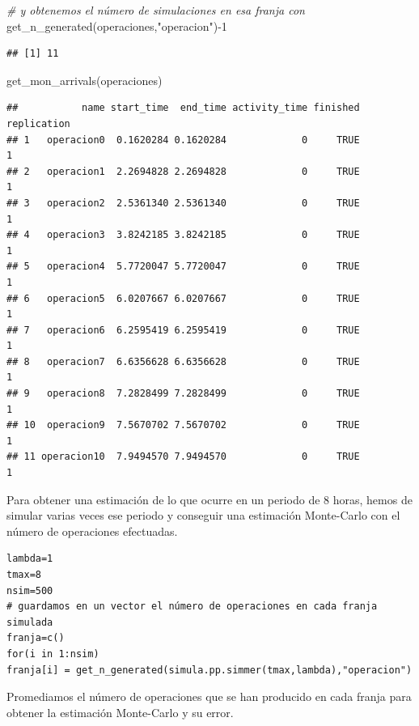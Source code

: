 \documentclass[
]{book}
\newenvironment{Shaded}{\begin{snugshade}}{\end{snugshade}}
\newcommand{\CommentTok}[1]{\textcolor[rgb]{0.56,0.35,0.01}{\textit{#1}}}
\newcommand{\DecValTok}[1]{\textcolor[rgb]{0.00,0.00,0.81}{#1}}
\newcommand{\FunctionTok}[1]{\textcolor[rgb]{0.00,0.00,0.00}{#1}}
\newcommand{\NormalTok}[1]{#1}
\newcommand{\SpecialCharTok}[1]{\textcolor[rgb]{0.00,0.00,0.00}{#1}}
\newcommand{\StringTok}[1]{\textcolor[rgb]{0.31,0.60,0.02}{#1}}
\theoremstyle{definition}
\theoremstyle{definition}
\theoremstyle{definition}
\theoremstyle{definition}
\theoremstyle{remark}
\begin{document}
\begin{Shaded}
\begin{Highlighting}[]
\CommentTok{\# y obtenemos el número de simulaciones en esa franja con}
\FunctionTok{get\_n\_generated}\NormalTok{(operaciones,}\StringTok{"operacion"}\NormalTok{)}\SpecialCharTok{{-}}\DecValTok{1}
\end{Highlighting}
\end{Shaded}

\begin{verbatim}
## [1] 11
\end{verbatim}

\begin{Shaded}
\begin{Highlighting}[]
\FunctionTok{get\_mon\_arrivals}\NormalTok{(operaciones)}
\end{Highlighting}
\end{Shaded}

\begin{verbatim}
##           name start_time  end_time activity_time finished replication
## 1   operacion0  0.1620284 0.1620284             0     TRUE           1
## 2   operacion1  2.2694828 2.2694828             0     TRUE           1
## 3   operacion2  2.5361340 2.5361340             0     TRUE           1
## 4   operacion3  3.8242185 3.8242185             0     TRUE           1
## 5   operacion4  5.7720047 5.7720047             0     TRUE           1
## 6   operacion5  6.0207667 6.0207667             0     TRUE           1
## 7   operacion6  6.2595419 6.2595419             0     TRUE           1
## 8   operacion7  6.6356628 6.6356628             0     TRUE           1
## 9   operacion8  7.2828499 7.2828499             0     TRUE           1
## 10  operacion9  7.5670702 7.5670702             0     TRUE           1
## 11 operacion10  7.9494570 7.9494570             0     TRUE           1
\end{verbatim}

Para obtener una estimación de lo que ocurre en un periodo de 8 horas, hemos de simular varias veces ese periodo y conseguir una estimación Monte-Carlo con el número de operaciones efectuadas.

\begin{verbatim}
lambda=1
tmax=8
nsim=500
# guardamos en un vector el número de operaciones en cada franja simulada
franja=c()
for(i in 1:nsim)
franja[i] = get_n_generated(simula.pp.simmer(tmax,lambda),"operacion")
\end{verbatim}

Promediamos el número de operaciones que se han producido en cada franja para obtener la estimación Monte-Carlo y su error.
\end{document}
